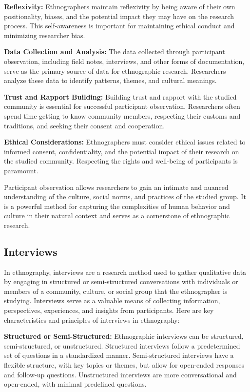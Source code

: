 \documentclass[
  b5paper]{book}
\begin{document}
\textbf{Reflexivity:} Ethnographers maintain reflexivity by being aware of their own positionality, biases, and the potential impact they may have on the research process. This self-awareness is important for maintaining ethical conduct and minimizing researcher bias.

\textbf{Data Collection and Analysis:} The data collected through participant observation, including field notes, interviews, and other forms of documentation, serve as the primary source of data for ethnographic research. Researchers analyze these data to identify patterns, themes, and cultural meanings.

\textbf{Trust and Rapport Building:} Building trust and rapport with the studied community is essential for successful participant observation. Researchers often spend time getting to know community members, respecting their customs and traditions, and seeking their consent and cooperation.

\textbf{Ethical Considerations:} Ethnographers must consider ethical issues related to informed consent, confidentiality, and the potential impact of their research on the studied community. Respecting the rights and well-being of participants is paramount.

Participant observation allows researchers to gain an intimate and nuanced understanding of the culture, social norms, and practices of the studied group. It is a powerful method for capturing the complexities of human behavior and culture in their natural context and serves as a cornerstone of ethnographic research.

\hypertarget{interviews-2}{%
\subsection*{Interviews}\label{interviews-2}}

In ethnography, interviews are a research method used to gather qualitative data by engaging in structured or semi-structured conversations with individuals or members of a community, culture, or social group that the ethnographer is studying. Interviews serve as a valuable means of collecting information, perspectives, experiences, and insights from participants. Here are key characteristics and principles of interviews in ethnography:

\textbf{Structured or Semi-Structured:} Ethnographic interviews can be structured, semi-structured, or unstructured. Structured interviews follow a predetermined set of questions in a standardized manner. Semi-structured interviews have a flexible structure, with key topics or themes, but allow for open-ended responses and follow-up questions. Unstructured interviews are more conversational and open-ended, with minimal predefined questions.
\end{document}
